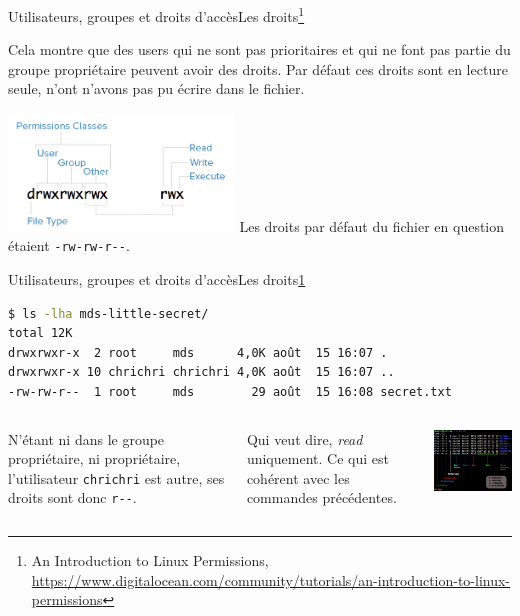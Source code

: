 \documentclass{beamer}
\begin{document}
    \begin{frame}{Utilisateurs, groupes et droits d'accès}{Les droits\footnote{\label{rights-digitalocean}An Introduction to Linux Permissions, \url{https://www.digitalocean.com/community/tutorials/an-introduction-to-linux-permissions}}}
        \begin{dangercolorbox}
            Cela montre que des users qui ne sont pas prioritaires et qui ne font pas partie du groupe propriétaire peuvent avoir des droits.
            Par défaut ces droits sont en lecture seule, n'ont n'avons pas pu écrire dans le fichier.
        \end{dangercolorbox}
        \centering
        \includegraphics[width=6cm]{image/permission-classes}
        \flushleft
        Les droits par défaut du fichier en question étaient \lstinline{-rw-rw-r--}.
    \end{frame}

    \begin{frame}[fragile]{Utilisateurs, groupes et droits d'accès}{Les droits\cref{rights-digitalocean}}
        \begin{lstlisting}[language=bash]
$ ls -lha mds-little-secret/
total 12K
drwxrwxr-x  2 root     mds      4,0K août  15 16:07 .
drwxrwxr-x 10 chrichri chrichri 4,0K août  15 16:07 ..
-rw-rw-r--  1 root     mds        29 août  15 16:08 secret.txt
        \end{lstlisting}
        \begin{columns}
            N'étant ni dans le groupe propriétaire, ni propriétaire, l'utilisateur \lstinline{chrichri} est autre, ses droits sont donc \lstinline{r--}.

            Qui veut dire, \textit{read} uniquement.
            Ce qui est cohérent avec les commandes précédentes.
            \begin{center}
                \includegraphics[width=6.5cm]{image/ls-details}
            \end{center}
        \end{columns}
    \end{frame}
\end{document}

